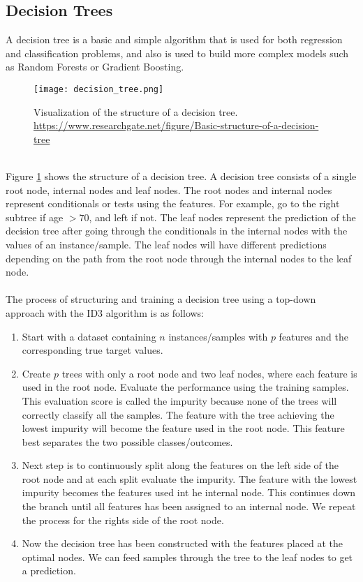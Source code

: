\documentclass[a4paper,twocolumn]{article}
\begin{document}
\subsection{Decision Trees}
A decision tree is a basic and simple algorithm that is used for both regression and classification problems, and also is used to build more complex models such as Random Forests or Gradient Boosting.
\begin{figure}[ht]
    \centering
    \texttt{[image: decision\_tree.png]}
    \caption{Visualization of the structure of a decision tree. \href{https://www.researchgate.net/figure/Basic-structure-of-a-decision-tree-All-decision-trees-are-built-through-recursion_fig3_295860754}{https://www.researchgate.net/figure/Basic-structure-of-a-decision-tree}}
    \label{fig:2}
\end{figure}\\
Figure \ref{fig:2} shows the structure of a decision tree. A decision tree consists of a single root node, internal nodes and leaf nodes. The root nodes and internal nodes represent conditionals or tests using the features. For example, go to the right subtree if age $> 70$, and left if not. The leaf nodes represent the prediction of the decision tree after going through the conditionals in the internal nodes with the values of an instance/sample. The leaf nodes will have different predictions depending on the path from the root node through the internal nodes to the leaf node.\\
\\
The process of structuring and training a decision tree using a top-down approach with the ID3 algorithm is as follows:
\begin{enumerate}
    \item Start with a dataset containing $n$ instances/samples with $p$ features and the corresponding true target values.
    \item Create $p$ trees with only a root node and two leaf nodes, where each feature is used in the root node. Evaluate the performance using the training samples. This evaluation score is called the impurity because none of the trees will correctly classify all the samples. The feature with the tree achieving the lowest impurity will become the feature used in the root node. This feature best separates the two possible classes/outcomes.
    \item Next step is to continuously split along the features on the left side of the root node and at each split evaluate the impurity. The feature with the lowest impurity becomes the features used int he internal node. This continues down the branch until all features has been assigned to an internal node. We repeat the process for the rights side of the root node.
    \item Now the decision tree has been constructed with the features placed at the optimal nodes. We can feed samples through the tree to the leaf nodes to get a prediction.
\end{enumerate}
\end{document}
